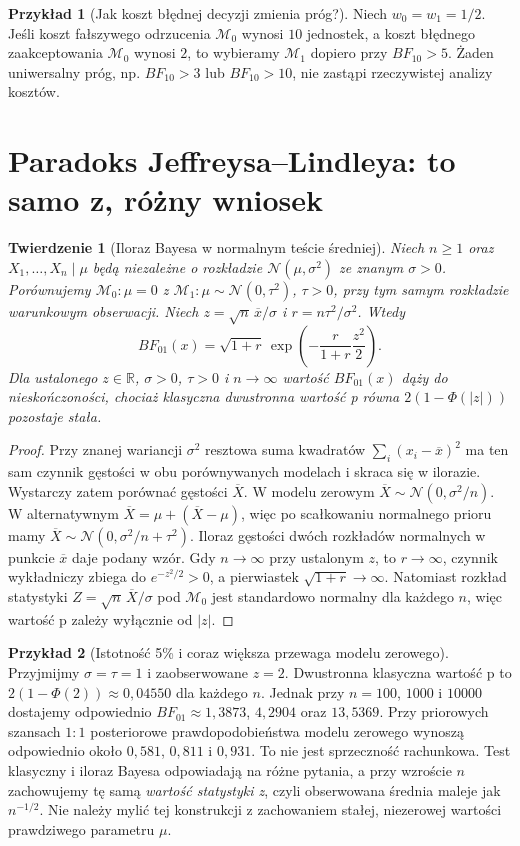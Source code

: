 \documentclass[11pt,a4paper,oneside]{report}
\numberwithin{equation}{chapter}
\theoremstyle{plain}
\newtheorem{twierdzenie}{Twierdzenie}[chapter]
\theoremstyle{definition}
\newtheorem{przyklad}{Przykład}[chapter]
\theoremstyle{remark}
\newcommand{\R}{\mathbb R}
\begin{document}
\begin{przyklad}[Jak koszt błędnej decyzji zmienia próg?]
Niech $w_0=w_1=1/2$. Jeśli koszt fałszywego odrzucenia
$\mathcal M_0$ wynosi $10$ jednostek, a koszt błędnego
zaakceptowania $\mathcal M_0$ wynosi $2$, to wybieramy
$\mathcal M_1$ dopiero przy $BF_{10}>5$.
Żaden uniwersalny próg, np. $BF_{10}>3$ lub $BF_{10}>10$,
nie zastąpi rzeczywistej analizy kosztów.
\end{przyklad}

\section{Paradoks Jeffreysa--Lindleya: to samo z, różny wniosek}
\begin{twierdzenie}[Iloraz Bayesa w normalnym teście średniej]
\label{thm:jeffreys-lindley}
Niech $n\ge1$ oraz $X_1,\ldots,X_n\mid\mu$ będą
niezależne o rozkładzie $\mathcal N(\mu,\sigma^2)$
ze znanym $\sigma>0$. Porównujemy
$\mathcal M_0:\mu=0$ z
$\mathcal M_1:\mu\sim\mathcal N(0,\tau^2)$,
$\tau>0$, przy tym samym rozkładzie warunkowym
obserwacji. Niech $z=\sqrt n\,\overline x/\sigma$
i $r=n\tau^2/\sigma^2$. Wtedy
\[
 BF_{01}(x)=\sqrt{1+r}\,
 \exp\!\left(-\frac{r}{1+r}\frac{z^2}{2}\right).
\]
Dla ustalonego $z\in\R$, $\sigma>0$, $\tau>0$ i $n\to\infty$
wartość $BF_{01}(x)$ dąży do nieskończoności, chociaż
klasyczna dwustronna wartość p równa
$2(1-\Phi(|z|))$ pozostaje stała.
\end{twierdzenie}
\begin{proof}
Przy znanej wariancji $\sigma^2$ resztowa suma kwadratów
$\sum_i(x_i-\overline x)^2$ ma ten sam czynnik gęstości
w obu porównywanych modelach i skraca się w ilorazie.
Wystarczy zatem porównać gęstości $\overline X$.
W modelu zerowym $\overline X\sim\mathcal N(0,\sigma^2/n)$.
W alternatywnym $\overline X=\mu+(\overline X-\mu)$,
więc po scałkowaniu normalnego prioru mamy
$\overline X\sim\mathcal N(0,\sigma^2/n+\tau^2)$.
Iloraz gęstości dwóch rozkładów normalnych w punkcie
$\overline x$ daje podany wzór.
Gdy $n\to\infty$ przy ustalonym $z$, to $r\to\infty$,
czynnik wykładniczy zbiega do $e^{-z^2/2}>0$,
a pierwiastek $\sqrt{1+r}\to\infty$. Natomiast rozkład
statystyki $Z=\sqrt n\,\overline X/\sigma$ pod $\mathcal M_0$
jest standardowo normalny dla każdego $n$, więc
wartość p zależy wyłącznie od $|z|$.
\end{proof}

\begin{przyklad}[Istotność 5\% i coraz większa przewaga modelu zerowego]
Przyjmijmy $\sigma=\tau=1$ i zaobserwowane $z=2$.
Dwustronna klasyczna wartość p to
$2(1-\Phi(2))\approx0{,}04550$ dla każdego $n$.
Jednak przy $n=100$, $1000$ i $10000$ dostajemy
odpowiednio $BF_{01}\approx1{,}3873$, $4{,}2904$ oraz
$13{,}5369$. Przy priorowych szansach $1:1$
posteriorowe prawdopodobieństwa modelu zerowego wynoszą
odpowiednio około $0{,}581$, $0{,}811$ i $0{,}931$.
To nie jest sprzeczność rachunkowa. Test klasyczny i iloraz
Bayesa odpowiadają na różne pytania, a przy wzroście $n$
zachowujemy tę samą \emph{wartość statystyki z}, czyli
obserwowana średnia maleje jak $n^{-1/2}$.
Nie należy mylić tej konstrukcji z zachowaniem
stałej, niezerowej wartości prawdziwego parametru $\mu$.
\end{przyklad}
\end{document}

